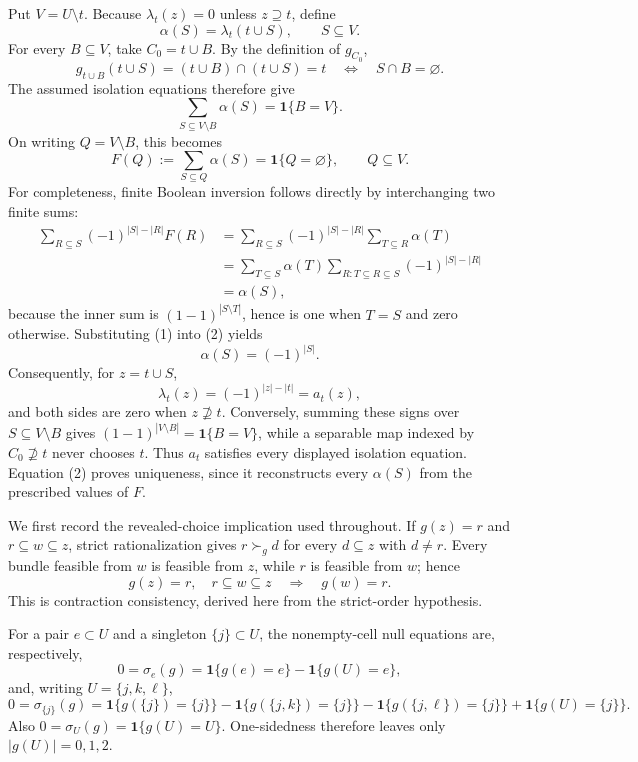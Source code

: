 Put \(V=U\setminus t\).  Because \(\lambda_t(z)=0\) unless \(z\supseteq t\), define
\[
\alpha(S)=\lambda_t(t\cup S),\qquad S\subseteq V.
\]
For every \(B\subseteq V\), take \(C_0=t\cup B\).  By the definition of \(g_{C_0}\),
\[
g_{t\cup B}(t\cup S)=(t\cup B)\cap(t\cup S)=t
\quad\Longleftrightarrow\quad S\cap B=\varnothing.
\]
The assumed isolation equations therefore give
\[
\sum_{S\subseteq V\setminus B}\alpha(S)=\mathbf 1\{B=V\}.
\]
On writing \(Q=V\setminus B\), this becomes
\[
F(Q):=\sum_{S\subseteq Q}\alpha(S)=\mathbf 1\{Q=\varnothing\},
\qquad Q\subseteq V. \tag{1}
\]
For completeness, finite Boolean inversion follows directly by interchanging two finite sums:
\[
\begin{aligned}
\sum_{R\subseteq S}(-1)^{|S|-|R|}F(R)
&=\sum_{R\subseteq S}(-1)^{|S|-|R|}\sum_{T\subseteq R}\alpha(T)\\
&=\sum_{T\subseteq S}\alpha(T)
  \sum_{R:T\subseteq R\subseteq S}(-1)^{|S|-|R|}\\
&=\alpha(S),
\end{aligned} \tag{2}
\]
because the inner sum is \((1-1)^{|S\setminus T|}\), hence is one when \(T=S\) and zero otherwise.  Substituting (1) into (2) yields
\[
\alpha(S)=(-1)^{|S|}.
\]
Consequently, for \(z=t\cup S\),
\[
\lambda_t(z)=(-1)^{|z|-|t|}=a_t(z),
\]
and both sides are zero when \(z\not\supseteq t\).  Conversely, summing these signs over \(S\subseteq V\setminus B\) gives \((1-1)^{|V\setminus B|}=\mathbf 1\{B=V\}\), while a separable map indexed by \(C_0\not\supseteq t\) never chooses \(t\).  Thus \(a_t\) satisfies every displayed isolation equation.  Equation (2) proves uniqueness, since it reconstructs every \(\alpha(S)\) from the prescribed values of \(F\).

We first record the revealed-choice implication used throughout.  If \(g(z)=r\) and \(r\subseteq w\subseteq z\), strict rationalization gives \(r\succ_g d\) for every \(d\subseteq z\) with \(d\ne r\).  Every bundle feasible from \(w\) is feasible from \(z\), while \(r\) is feasible from \(w\); hence
\[
g(z)=r,\quad r\subseteq w\subseteq z
\quad\Longrightarrow\quad g(w)=r. \tag{3}
\]
This is contraction consistency, derived here from the strict-order hypothesis.

For a pair \(e\subset U\) and a singleton \(\{j\}\subset U\), the nonempty-cell null equations are, respectively,
\[
0=\sigma_e(g)=\mathbf 1\{g(e)=e\}-\mathbf 1\{g(U)=e\}, \tag{4}
\]
and, writing \(U=\{j,k,\ell\}\),
\[
0=\sigma_{\{j\}}(g)
=\mathbf 1\{g(\{j\})=\{j\}\}
-\mathbf 1\{g(\{j,k\})=\{j\}\}
-\mathbf 1\{g(\{j,\ell\})=\{j\}\}
+\mathbf 1\{g(U)=\{j\}\}. \tag{5}
\]
Also \(0=\sigma_U(g)=\mathbf 1\{g(U)=U\}\).  One-sidedness therefore leaves only \(|g(U)|=0,1,2\).

